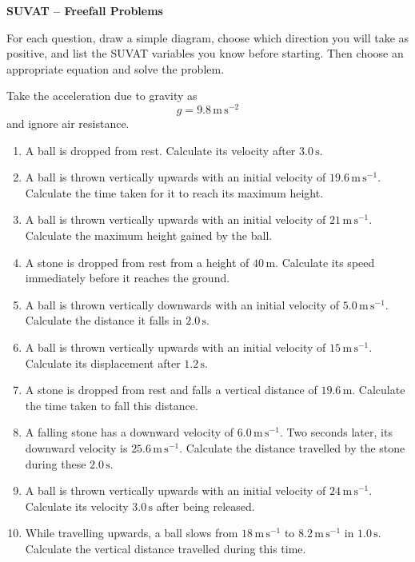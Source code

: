 \documentclass[11pt,a4paper]{article}
\begin{document}
\begin{center}
    {\LARGE \textbf{SUVAT -- Freefall Problems}}
\end{center}

For each question, draw a simple diagram, choose which direction you will take as positive, and list the SUVAT variables you know before starting. Then choose an appropriate equation and solve the problem.

Take the acceleration due to gravity as
\[
g = 9.8\,\mathrm{m\,s^{-2}}
\]
and ignore air resistance.

\begin{enumerate}[leftmargin=*, itemsep=1.2em]

    \item A ball is dropped from rest. Calculate its velocity after
    \(3.0\,\mathrm{s}\).

    \item A ball is thrown vertically upwards with an initial velocity of
    \(19.6\,\mathrm{m\,s^{-1}}\). Calculate the time taken for it to reach its
    maximum height.

    \item A ball is thrown vertically upwards with an initial velocity of
    \(21\,\mathrm{m\,s^{-1}}\). Calculate the maximum height gained by the ball.

    \item A stone is dropped from rest from a height of \(40\,\mathrm{m}\).
    Calculate its speed immediately before it reaches the ground.

    \item A ball is thrown vertically downwards with an initial velocity of
    \(5.0\,\mathrm{m\,s^{-1}}\). Calculate the distance it falls in
    \(2.0\,\mathrm{s}\).

    \item A ball is thrown vertically upwards with an initial velocity of
    \(15\,\mathrm{m\,s^{-1}}\). Calculate its displacement after
    \(1.2\,\mathrm{s}\).

    \item A stone is dropped from rest and falls a vertical distance of
    \(19.6\,\mathrm{m}\). Calculate the time taken to fall this distance.

    \item A falling stone has a downward velocity of
    \(6.0\,\mathrm{m\,s^{-1}}\). Two seconds later, its downward velocity is
    \(25.6\,\mathrm{m\,s^{-1}}\). Calculate the distance travelled by the stone
    during these \(2.0\,\mathrm{s}\).

    \item A ball is thrown vertically upwards with an initial velocity of
    \(24\,\mathrm{m\,s^{-1}}\). Calculate its velocity \(3.0\,\mathrm{s}\)
    after being released.

    \item While travelling upwards, a ball slows from
    \(18\,\mathrm{m\,s^{-1}}\) to \(8.2\,\mathrm{m\,s^{-1}}\) in
    \(1.0\,\mathrm{s}\). Calculate the vertical distance travelled during this
    time.

\end{enumerate}
\end{document}
